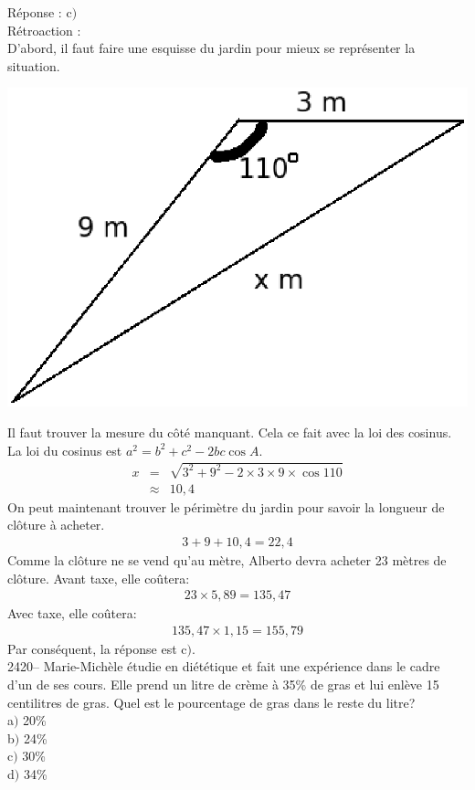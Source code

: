 \documentclass[letterpaper, 12pt]{article}
\begin{document}
R\'eponse : c$)$\\

R\'etroaction :\\
D'abord, il faut faire une esquisse du jardin pour mieux se repr\'esenter la situation.
\begin{center}
 \includegraphics[width=8 cm,bb=0 555 494 842]{Q2419.eps}
\end{center}
Il faut trouver la mesure du c\^ot\'e manquant. Cela ce fait avec la loi des cosinus. La loi du cosinus est $a^{2}=b^{2}+c^{2}-2bc\cos{A}$.
\begin{eqnarray*}
 x &=& \sqrt{3^{2}+9^{2}-2\times3\times9\times\cos{110}}\\
  &\approx& 10,4
\end{eqnarray*}
On peut maintenant trouver le p\'erim\`etre du jardin pour savoir la longueur de cl\^oture \`a acheter.
\begin{eqnarray*}
 3+9+10,4=22,4
\end{eqnarray*}
Comme la cl\^oture ne se vend qu'au m\`etre, Alberto devra acheter 23 m\`etres de cl\^oture. Avant taxe, elle co\^utera:
\begin{eqnarray*}
  23 \times 5,89 = 135,47
\end{eqnarray*}
Avec taxe, elle co\^utera:
\begin{eqnarray*}
  135,47 \times 1,15 = 155,79
\end{eqnarray*}
Par cons\'equent, la r\'eponse est c$)$.\\

2420-- Marie-Mich\`ele \'etudie en di\'et\'etique et fait une exp\'erience dans le cadre d'un de ses cours. Elle prend un litre de cr\`eme \`a 35\% de gras et lui enl\`eve 15 centilitres de gras. Quel est le pourcentage de gras dans le reste du litre?\\

a$)$ 20\%\\
b$)$ 24\%\\
c$)$ 30\%\\
d$)$ 34\%\\
\end{document}
